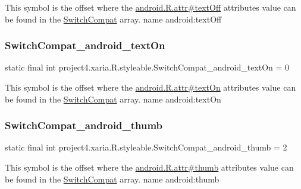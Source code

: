 This symbol is the offset where the \hyperlink{}{android.\+R.\+attr\#text\+Off} attribute\textquotesingle{}s value can be found in the \hyperlink{classproject4_1_1xaria_1_1R_1_1styleable_a15d9950df3a97e57d9c57e4c4b7e8e87}{Switch\+Compat} array.  name android\+:text\+Off \mbox{\label{classproject4_1_1xaria_1_1R_1_1styleable_addeae4c36c168e8d419f957fd6c97234}} 
\subsubsection{\texorpdfstring{Switch\+Compat\+\_\+android\+\_\+text\+On}{SwitchCompat\_android\_textOn}}
{\footnotesize\ttfamily static final int project4.\+xaria.\+R.\+styleable.\+Switch\+Compat\+\_\+android\+\_\+text\+On = 0\hspace{0.3cm}{\ttfamily [static]}}

This symbol is the offset where the \hyperlink{}{android.\+R.\+attr\#text\+On} attribute\textquotesingle{}s value can be found in the \hyperlink{classproject4_1_1xaria_1_1R_1_1styleable_a15d9950df3a97e57d9c57e4c4b7e8e87}{Switch\+Compat} array.  name android\+:text\+On \mbox{\label{classproject4_1_1xaria_1_1R_1_1styleable_a022bff7fbd81db1814b1440617e056c3}} 
\subsubsection{\texorpdfstring{Switch\+Compat\+\_\+android\+\_\+thumb}{SwitchCompat\_android\_thumb}}
{\footnotesize\ttfamily static final int project4.\+xaria.\+R.\+styleable.\+Switch\+Compat\+\_\+android\+\_\+thumb = 2\hspace{0.3cm}{\ttfamily [static]}}

This symbol is the offset where the \hyperlink{}{android.\+R.\+attr\#thumb} attribute\textquotesingle{}s value can be found in the \hyperlink{classproject4_1_1xaria_1_1R_1_1styleable_a15d9950df3a97e57d9c57e4c4b7e8e87}{Switch\+Compat} array.  name android\+:thumb \mbox{\label{classproject4_1_1xaria_1_1R_1_1styleable_a14c2b4b128399b1f12166f13c16525d4}} 
